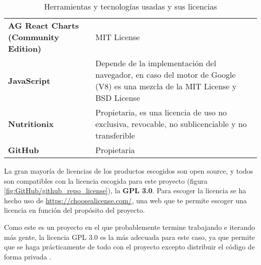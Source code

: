 \begin{table}[p]
\begin{tabularx}{\linewidth}{ p{} p{} }
\textbf{AG React Charts (Community Edition)}    & MIT License                                                                                                                \\
\textbf{JavaScript}                             & Depende de la implementación del navegador, en caso del motor de Google (V8) es una mezcla de la MIT License y BSD License \\
\textbf{Nutritionix}                            & Propietaria, es una licencia de uso no exclusiva, revocable, no sublicenciable y no transferible                           \\
\textbf{GitHub}                                 & Propietaria                      \\ \bottomrule                                                                                     
\end{tabularx}
\caption{Herramientas y tecnologías usadas y sus licencias}
\label{tab:licencias}
\end{table}

La gran mayoría de licencias de los productos escogidos son open source, y todos son compatibles con la licencia escogida para este proyecto (figura \ref{fig:GitHub/github_repo_license}), la \textbf{GPL 3.0}. Para escoger la licencia se ha hecho uso de \href{https://choosealicense.com/}{https://choosealicense.com/}, una web que te permite escoger una licencia en función del propósito del proyecto. 

Como este es un proyecto en el que probablemente termine trabajando e iterando más gente, la licencia GPL 3.0 es la más adecuada para este caso, ya que permite que se haga prácticamente de todo con el proyecto excepto distribuir el código de forma privada \cite{choose-license:gnu-3.0}.

